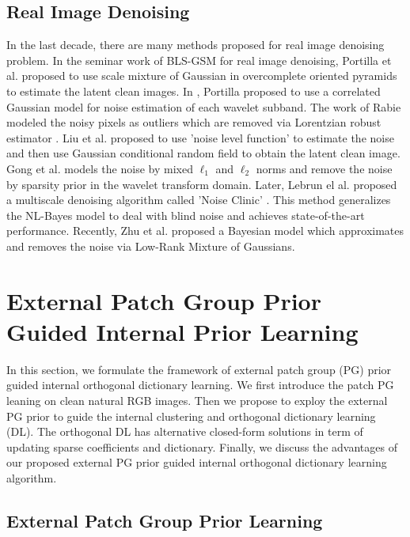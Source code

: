 \documentclass[10pt,twocolumn,letterpaper]{article}
\begin{document}
\subsection{Real Image Denoising}

In the last decade, there are many methods \cite{fullyblind,rabie2005robust,Liu2008,almapg,noiseclinic,Zhu_2016_CVPR,crosschannel2016} proposed for real image denoising problem. In the seminar work of BLS-GSM \cite{blsgsm} for real image denoising, Portilla et al. proposed to use scale mixture of Gaussian in overcomplete oriented pyramids to estimate the latent clean images. In \cite{fullyblind}, Portilla proposed to use a correlated Gaussian model for noise estimation of each wavelet subband. The work of Rabie \cite{rabie2005robust} modeled the noisy pixels as outliers which are removed via Lorentzian robust estimator \cite{huber2011robust}. Liu et al. \cite{Liu2008} proposed to use 'noise level function' to estimate the noise and then use Gaussian conditional random field to obtain the latent clean image. Gong et al. \cite{almapg} models the noise by mixed $\ell_{1}$ and $\ell_{2}$ norms and remove the noise by sparsity prior in the wavelet transform domain. Later, Lebrun el al. proposed a multiscale denoising algorithm called 'Noise Clinic' \cite{noiseclinic}. This method generalizes the NL-Bayes model \cite{nlbayes} to deal with blind noise and achieves state-of-the-art performance. Recently, Zhu et al. proposed a Bayesian model \cite{Zhu_2016_CVPR} which approximates and removes the noise via Low-Rank Mixture of Gaussians.

\section{External Patch Group Prior Guided Internal Prior Learning}

In this section, we formulate the framework of external patch group (PG) prior guided internal orthogonal dictionary learning. We first introduce the patch PG leaning on clean natural RGB images. Then we propose to exploy the external PG prior to guide the internal clustering and orthogonal dictionary learning (DL). The orthogonal DL has alternative closed-form solutions in term of updating sparse coefficients and dictionary. Finally, we discuss the advantages of our proposed external PG prior guided internal orthogonal dictionary learning algorithm.

\subsection{External Patch Group Prior Learning}
\end{document}
